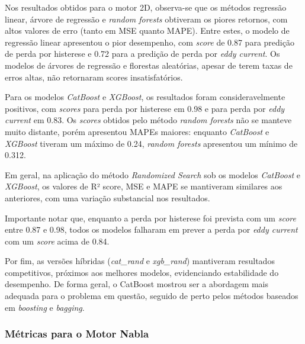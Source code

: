 \documentclass{article}
\begin{document}
Nos resultados obtidos para o motor 2D, observa-se que os métodos regressão linear, árvore de regressão e \textit{random forests} obtiveram os piores retornos, com altos valores de erro (tanto em MSE quanto MAPE). Entre estes, o modelo de regressão linear apresentou o pior desempenho, com \textit{score} de 0.87 para predição de perda por histerese e 0.72 para a predição de perda por \textit{eddy current}. Os modelos de árvores de regressão e florestas aleatórias, apesar de terem taxas de erros altas, não retornaram scores insatisfatórios.

Para os modelos \textit{CatBoost} e \textit{XGBoost}, os resultados foram consideravelmente positivos, com \textit{scores} para perda por histerese em 0.98 e para perda por \textit{eddy current} em 0.83. Os \textit{scores} obtidos pelo método \textit{random forests} não se manteve muito distante, porém apresentou MAPEs maiores: enquanto \textit{CatBoost} e \textit{XGBoost} tiveram um máximo de 0.24, \textit{random forests} apresentou um mínimo de 0.312.

Em geral, na aplicação do método \textit{Randomized Search} sob os modelos \textit{CatBoost} e \textit{XGBoost}, os valores de R² score, MSE e MAPE se mantiveram similares aos anteriores, com uma variação substancial nos resultados.

Importante notar que, enquanto a perda por histerese foi prevista com um \textit{score} entre 0.87 e 0.98, todos os modelos falharam em prever a perda por \textit{eddy current} com um \textit{score} acima de 0.84.

Por fim, as versões híbridas (\textit{cat\_rand} e \textit{xgb\_rand}) mantiveram resultados competitivos, próximos aos melhores modelos, evidenciando estabilidade do desempenho. De forma geral, o CatBoost mostrou ser a abordagem mais adequada para o problema em questão, seguido de perto pelos métodos baseados em \textit{boosting} e \textit{bagging}.

\subsubsection{Métricas para o Motor Nabla}
\end{document}
